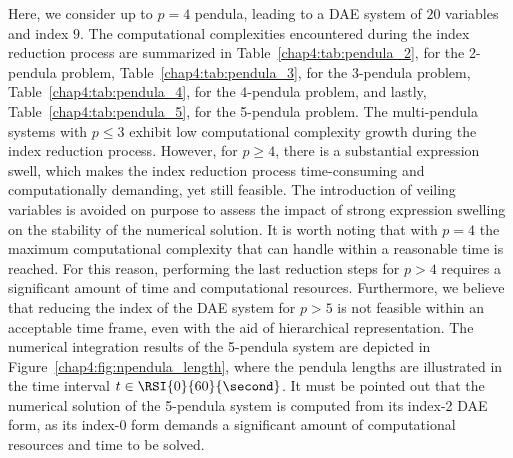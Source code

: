 Here, we consider up to $p = 4$ pendula, leading to a \ac{DAE} system of $20$ variables and index $9$. The computational complexities encountered during the index reduction process are summarized in Table~\ref{chap4:tab:pendula_2}, for the 2-pendula problem, Table~\ref{chap4:tab:pendula_3}, for the 3-pendula problem, Table~\ref{chap4:tab:pendula_4}, for the 4-pendula problem, and lastly, Table~\ref{chap4:tab:pendula_5}, for the 5-pendula problem. The multi-pendula systems with $p \leq 3$ exhibit low computational complexity growth during the index reduction process. However, for $p \geq 4$, there is a substantial expression swell, which makes the index reduction process time-consuming and computationally demanding, yet still feasible. The introduction of veiling variables is avoided on purpose to assess the impact of strong expression swelling on the stability of the numerical solution.
It is worth noting that with $p = 4$ the maximum computational complexity that \Maple{} can handle within a reasonable time is reached. For this reason, performing the last reduction steps for $p > 4$ requires a significant amount of time and computational resources. Furthermore, we believe that reducing the index of the \ac{DAE} system for $p > 5$ is not feasible within an acceptable time frame, even with the aid of hierarchical representation. The numerical integration results of the 5-pendula system are depicted in Figure~\ref{chap4:fig:npendula_length}, where the pendula lengths are illustrated in the time interval $t \in \RSI{0}{60}{\second}$. It must be pointed out that the numerical solution of the 5-pendula system is computed from its index-2 \ac{DAE} form, as its index-0 form demands a significant amount of computational resources and time to be solved.

